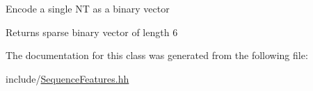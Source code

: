 Encode a single NT as a binary vector

\begin{DoxyReturn}{Returns}
sparse binary vector of length 6 
\end{DoxyReturn}


The documentation for this class was generated from the following file\+:\begin{DoxyCompactItemize}
\item 
include/\mbox{\hyperlink{_sequence_features_8hh}{Sequence\+Features.\+hh}}\end{DoxyCompactItemize}
